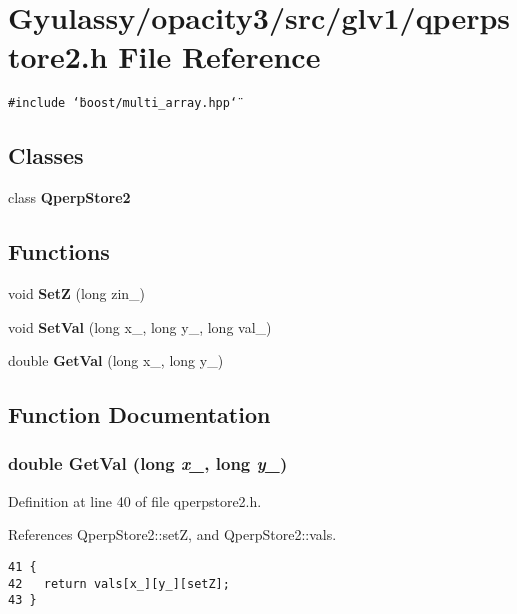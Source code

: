 \section{Gyulassy/opacity3/src/glv1/qperpstore2.h File Reference}
\label{qperpstore2_8h}
{\tt \#include \char`\"{}boost/multi\_\-array.hpp\char`\"{}}\par
\subsection*{Classes}
\begin{CompactItemize}
\item 
class {\bf QperpStore2}
\end{CompactItemize}
\subsection*{Functions}
\begin{CompactItemize}
\item 
void {\bf SetZ} (long zin\_\-)
\item 
void {\bf SetVal} (long x\_\-, long y\_\-, long val\_\-)
\item 
double {\bf GetVal} (long x\_\-, long y\_\-)
\end{CompactItemize}


\subsection{Function Documentation}
\subsubsection{\setlength{\rightskip}{0pt plus 5cm}double GetVal (long {\em x\_\-}, long {\em y\_\-})}\label{qperpstore2_8h_be1f66be610bdae78fdcdf045421bd11}




Definition at line 40 of file qperpstore2.h.

References QperpStore2::setZ, and QperpStore2::vals.

\begin{Code}\begin{verbatim}41 {
42   return vals[x_][y_][setZ];
43 }
\end{verbatim}
\end{Code}


